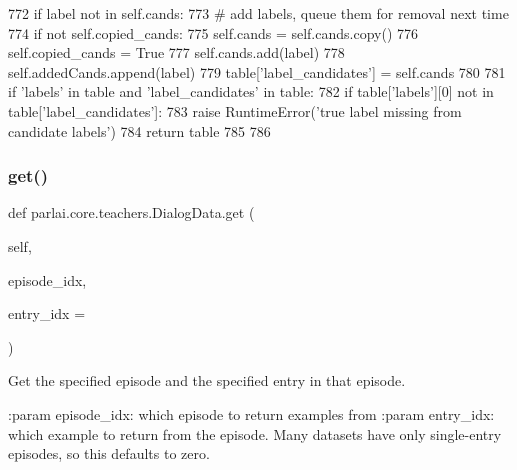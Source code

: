 \begin{DoxyCode}
772                 \textcolor{keywordflow}{if} label \textcolor{keywordflow}{not} \textcolor{keywordflow}{in} self.cands:
773                     \textcolor{comment}{# add labels, queue them for removal next time}
774                     \textcolor{keywordflow}{if} \textcolor{keywordflow}{not} self.copied\_cands:
775                         self.cands = self.cands.copy()
776                         self.copied\_cands = \textcolor{keyword}{True}
777                     self.cands.add(label)
778                     self.addedCands.append(label)
779             table[\textcolor{stringliteral}{'label\_candidates'}] = self.cands
780 
781         \textcolor{keywordflow}{if} \textcolor{stringliteral}{'labels'} \textcolor{keywordflow}{in} table \textcolor{keywordflow}{and} \textcolor{stringliteral}{'label\_candidates'} \textcolor{keywordflow}{in} table:
782             \textcolor{keywordflow}{if} table[\textcolor{stringliteral}{'labels'}][0] \textcolor{keywordflow}{not} \textcolor{keywordflow}{in} table[\textcolor{stringliteral}{'label\_candidates'}]:
783                 \textcolor{keywordflow}{raise} RuntimeError(\textcolor{stringliteral}{'true label missing from candidate labels'})
784         \textcolor{keywordflow}{return} table
785 
786 
\end{DoxyCode}
\mbox{\label{classparlai_1_1core_1_1teachers_1_1DialogData_a1e037df2f18a67503db657ae4cc27ab4}} 
\subsubsection{\texorpdfstring{get()}{get()}}
{\footnotesize\ttfamily def parlai.\+core.\+teachers.\+Dialog\+Data.\+get (\begin{DoxyParamCaption}\item[{}]{self,  }\item[{}]{episode\+\_\+idx,  }\item[{}]{entry\+\_\+idx = {} }\end{DoxyParamCaption})}

\begin{DoxyVerb}Get the specified episode and the specified entry in that episode.

:param episode_idx:
    which episode to return examples from
:param entry_idx:
    which example to return from the episode. Many datasets have only
    single-entry episodes, so this defaults to zero.
\end{DoxyVerb}
 

